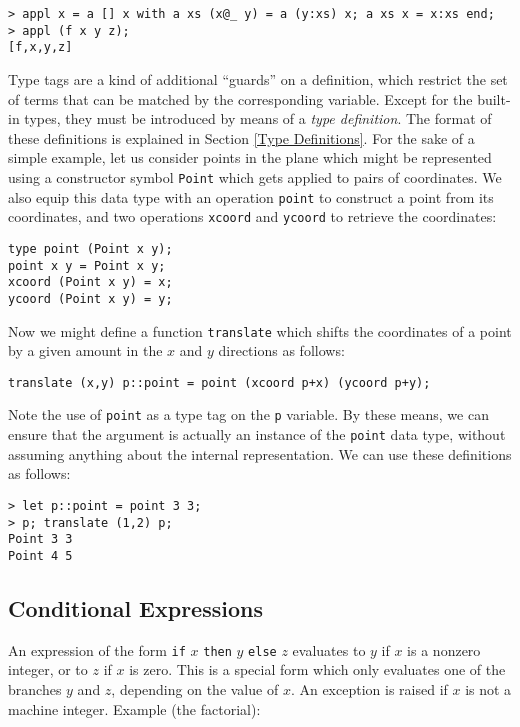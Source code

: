 \documentclass[a4paper,12pt]{article}
\begin{document}
\begin{lstlisting}
> appl x = a [] x with a xs (x@_ y) = a (y:xs) x; a xs x = x:xs end;
> appl (f x y z);
[f,x,y,z]
\end{lstlisting}

Type tags are a kind of additional ``guards'' on a definition, which restrict the set of terms that can be matched by the corresponding variable. Except for the built-in types, they must be introduced by means of a \emph{type definition}. The format of these definitions is explained in Section \ref{Type Definitions}. For the sake of a simple example, let us consider points in the plane which might be represented using a constructor symbol \verb|Point| which gets applied to pairs of coordinates. We also equip this data type with an operation \verb|point| to construct a point from its coordinates, and two operations \verb|xcoord| and \verb|ycoord| to retrieve the coordinates:

\begin{lstlisting}
type point (Point x y);
point x y = Point x y;
xcoord (Point x y) = x;
ycoord (Point x y) = y;
\end{lstlisting}

Now we might define a function \verb|translate| which shifts the coordinates of a point by a given amount in the $x$ and $y$ directions as follows:

\begin{lstlisting}
translate (x,y) p::point = point (xcoord p+x) (ycoord p+y);
\end{lstlisting}

Note the use of \verb|point| as a type tag on the \verb|p| variable. By these means, we can ensure that the argument is actually an instance of the \verb|point| data type, without assuming anything about the internal representation. We can use these definitions as follows:

\begin{lstlisting}
> let p::point = point 3 3;
> p; translate (1,2) p;
Point 3 3
Point 4 5
\end{lstlisting}

\subsection{Conditional Expressions}

An expression of the form \lstinline{if} $x$ \lstinline{then} $y$ \lstinline{else} $z$ evaluates to $y$ if $x$ is a nonzero integer, or to $z$ if $x$ is zero. This is a special form which only evaluates one of the branches $y$ and $z$, depending on the value of $x$. An exception is raised if $x$ is not a machine integer. Example (the factorial):
\end{document}

